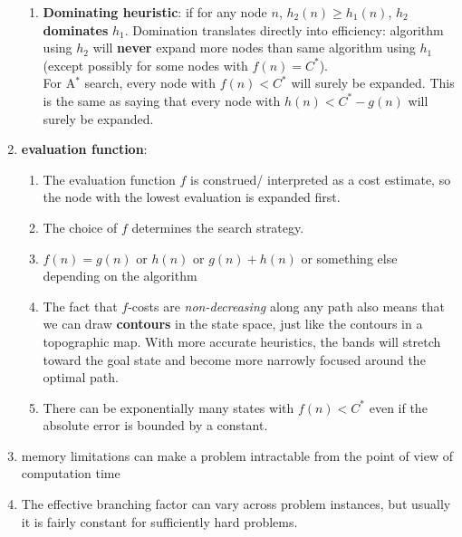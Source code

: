 \begin{enumerate}[itemsep=0.2cm]
\begin{enumerate}[itemsep=0.2cm]
        \item \textbf{Dominating heuristic}: if for any node $n$, $h_2(n) \geq h_1(n)$, $h_2$ \textbf{dominates} $h_1$.
        Domination translates directly into efficiency: algorithm using $h_2$ will \textbf{never} expand more nodes than same algorithm using $h_1$ 
        (except possibly for some nodes with $f(n) = C^\ast$).
        \hfill \cite{ai/book/Artificial-Intelligence-A-Modern-Approach/Russell-Norvig}
        \\
        For A$^\ast$ search, every node with $f(n) < C^\ast$ will surely be expanded.
        This is the same as saying that every node with $h(n) < C^\ast - g(n)$ will surely be expanded.
        \hfill \cite{ai/book/Artificial-Intelligence-A-Modern-Approach/Russell-Norvig}
    \end{enumerate}

    \item \textbf{evaluation function}:
    \begin{enumerate}[itemsep=0.2cm]
        \item The evaluation function $f$ is construed/ interpreted as a cost estimate, so the node with the lowest evaluation is expanded first.
        \hfill \cite{ai/book/Artificial-Intelligence-A-Modern-Approach/Russell-Norvig}
        
        \item The choice of $f$ determines the search strategy.
        \hfill \cite{ai/book/Artificial-Intelligence-A-Modern-Approach/Russell-Norvig}

        \item $f(n) = g(n)$ or $h(n)$ or $g(n)+h(n)$ or something else depending on the algorithm

        \item The fact that $f$-costs are \textit{non-decreasing} along any path also means that we can draw \textbf{contours} in the state space, just like the contours in a topographic map. 
        With more accurate heuristics, the bands will stretch toward the goal state and become more narrowly focused around the optimal path.
        \hfill \cite{ai/book/Artificial-Intelligence-A-Modern-Approach/Russell-Norvig}

        \item There can be exponentially many states with $f(n) < C^\ast$ even if the absolute error is bounded by a constant.
        \hfill \cite{ai/book/Artificial-Intelligence-A-Modern-Approach/Russell-Norvig}

        
    \end{enumerate}

    \item memory limitations can make a problem intractable from the point of view of computation time
    \hfill \cite{ai/book/Artificial-Intelligence-A-Modern-Approach/Russell-Norvig}

    \item The effective branching factor can vary across problem instances, but usually it is fairly constant for sufficiently hard problems.
    \hfill \cite{ai/book/Artificial-Intelligence-A-Modern-Approach/Russell-Norvig}
\end{enumerate}
